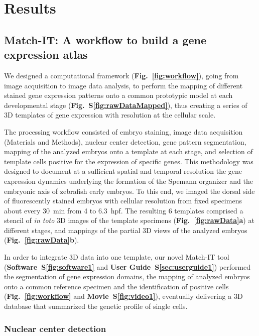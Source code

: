 \section*{Results}

\subsection*{Match-IT: A workflow to build a gene expression atlas}
\label{subsec:Match-IT}

We designed a computational framework (\textbf{Fig.~\ref{fig:workflow}}), going from image acquisition to image data analysis, to perform the mapping of different stained gene expression patterns onto a common prototypic model at each developmental stage (\textbf{Fig.~S\ref{fig:rawDataMapped}}), thus creating a series of 3D templates of gene expression with resolution at the cellular scale.

The processing workflow consisted of embryo staining, image data acquisition (Materials and Methods), nuclear center detection, gene pattern segmentation, mapping of the analyzed embryos onto a template at each stage, and selection of template cells positive for the expression of specific genes. This methodology was designed to document at a sufficient spatial and temporal resolution the gene expression dynamics underlying the formation of the Spemann organizer and the embryonic axis of zebrafish early embryos. To this end, we imaged the dorsal side of fluorescently stained embryos with cellular resolution from fixed specimens about every 30~min from 4 to 6.3~hpf. The resulting 6 templates comprised a stencil of \emph{in toto} 3D images of the template specimens (\textbf{Fig.~\ref{fig:rawData}a}) at different stages, and mappings of the partial 3D views of the analyzed embryos (\textbf{Fig.~\ref{fig:rawData}b}).

In order to integrate 3D data into one template, our novel Match-IT tool (\textbf{Software~S\ref{fig:software1}} and \textbf{User Guide~S\ref{sec:userguide1}}) performed the segmentation of gene expression domains, the mapping of analyzed embryos onto a common reference specimen and the identification of positive cells (\textbf{Fig.~\ref{fig:workflow}} and \textbf{Movie~S\ref{fig:video1}}), eventually delivering a 3D database that summarized the genetic profile of single cells.

\subsubsection*{Nuclear center detection}
\label{subsec:NuclearDetection}

